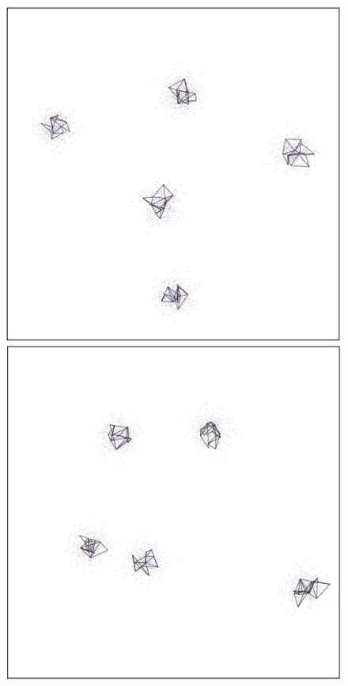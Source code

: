 \documentclass[
  12pt]{article}
\begin{document}
\begin{figure}[H]

\begin{minipage}{0.33\linewidth}
\includegraphics{figures/five_gau_clusters/sc_tsne_1.png}\end{minipage}%
%
\begin{minipage}{0.33\linewidth}
\includegraphics{figures/five_gau_clusters/sc_tsne_2.png}\end{minipage}%

\end{figure}
\end{document}
